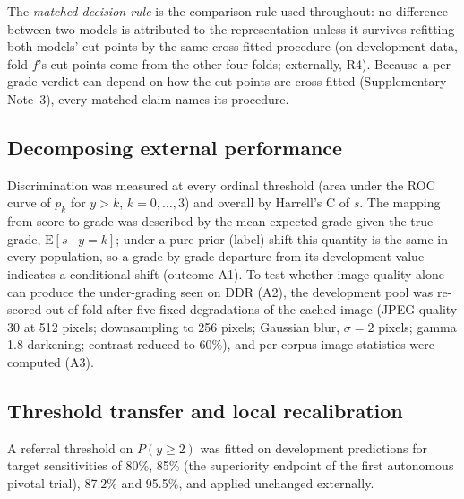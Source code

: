 The \emph{matched decision rule} is the comparison rule used throughout: no difference between
two models is attributed to the representation unless it survives refitting both models'
cut-points by the same cross-fitted procedure (on development data, fold $f$'s cut-points come
from the other four folds; externally, R4). Because a per-grade verdict can depend on how the
cut-points are cross-fitted (Supplementary Note~3), every matched claim names its procedure.

\subsection{Decomposing external performance}

Discrimination was measured at every ordinal threshold (area under the ROC curve of $p_k$ for
$y>k$, $k=0,\dots,3$) and overall by Harrell's C of $s$. The mapping from score to grade was
described by the mean expected grade given the true grade, $\mathrm{E}[s\mid y=k]$; under a pure
prior (label) shift this quantity is the same in every population, so a grade-by-grade departure
from its development value indicates a conditional shift (outcome A1). To test whether image
quality alone can produce the under-grading seen on DDR (A2), the development pool was re-scored
out of fold after five fixed degradations of the cached image (JPEG quality 30 at 512 pixels;
downsampling to 256 pixels; Gaussian blur, $\sigma=2$ pixels; gamma 1.8 darkening; contrast
reduced to 60\%), and per-corpus image statistics were computed (A3).

\subsection{Threshold transfer and local recalibration}

A referral threshold on $P(y\geq2)$ was fitted on development predictions for target
sensitivities of 80\%, 85\% (the superiority endpoint of the first autonomous pivotal
trial\cite{abramoff2018pivotal}), 87.2\% and 95.5\%, and applied unchanged externally.

